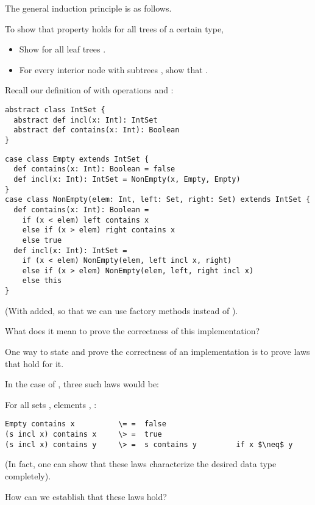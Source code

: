 {The general induction principle is as follows.

To show that property  holds for all trees of a certain type,
\begin{itemize}
\item Show  for all leaf trees .
\item For every interior node  with subtrees , 
      show that .
\end{itemize} 

\example Recall our definition of  with 
operations  and :

\begin{lstlisting}
abstract class IntSet {
  abstract def incl(x: Int): IntSet
  abstract def contains(x: Int): Boolean
}
\end{lstlisting}
\es\bs
\begin{lstlisting}
case class Empty extends IntSet {
  def contains(x: Int): Boolean = false
  def incl(x: Int): IntSet = NonEmpty(x, Empty, Empty)
}
case class NonEmpty(elem: Int, left: Set, right: Set) extends IntSet {
  def contains(x: Int): Boolean =
    if (x < elem) left contains x
    else if (x > elem) right contains x
    else true
  def incl(x: Int): IntSet =
    if (x < elem) NonEmpty(elem, left incl x, right)
    else if (x > elem) NonEmpty(elem, left, right incl x)
    else this
}
\end{lstlisting}
(With  added, so that we can use factory methods instead of ).

What does it mean to prove the correctness of this implementation?
\es
{}

One way to state and prove the correctness of an implementation is
to prove laws that hold for it.

In the case of , three such laws would be:

For all sets , elements , :

\begin{lstlisting}
Empty contains x          \= =  false
(s incl x) contains x     \> =  true
(s incl x) contains y     \> =  s contains y         if x $\neq$ y
\end{lstlisting}

(In fact, one can show that these laws characterize the desired data
type completely).

How can we establish that these laws hold?

}
